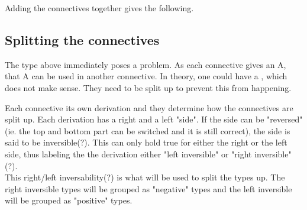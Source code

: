 Adding the connectives together gives the following. 

\subsection{Splitting the connectives}
\label{LL_02}

The type above immediately poses a problem. As each connective gives an A, that A can be used in another connective. In theory, one could have a , which does not make sense. They need to be split up to prevent this from happening.

Each connective its own derivation and they determine how the connectives are split up. Each derivation has a right and a left "side". If the side can be "reversed" (ie. the top and bottom part can be switched and it is still correct), the side is said to be inversible(?). This can only hold true for either the right or the left side, thus labeling the the derivation either "left inversible" or "right inversible"(?).\\ 
This right/left inversability(?) is what will be used to split the types up. The right inversible types will be grouped as "negative" types and the left inversible will be grouped as "positive" types.

